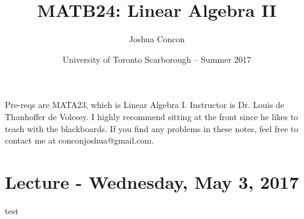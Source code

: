 \documentclass[12pt]{article}
\begin{document}
\title{MATB24: Linear Algebra II}
\date{University of Toronto Scarborough -- Summer 2017}
\author{Joshua Concon}
\maketitle

Pre-reqs are MATA23, which is Linear Algebra I.
Instructor is Dr. Louis de Thanhoffer de Volcsey. I highly recommend sitting at the front since he likes to teach with the blackboards. If you find any problems in these notes, feel free to contact me at conconjoshua@gmail.com.

\tableofcontents

\pagebreak

\section{Lecture - Wednesday, May 3, 2017}

test
\end{document}
